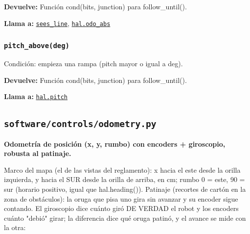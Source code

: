 \par{}\par\smallskip
\noindent\textbf{Devuelve:} Función cond(bits, junction) para follow\_until().\par
\noindent\textbf{Llama a:} \hyperref[fn:linefollow:sees-line]{\texttt{sees\_\allowbreak{}line}}, \hyperref[fn:hal:odo-abs]{\texttt{hal.odo\_\allowbreak{}abs}}\par

\subsubsection{\texttt{pitch\_\allowbreak{}above(deg)}}\label{fn:linefollow:pitch-above}
\noindent Condición: empieza una rampa (pitch mayor o igual a deg).

\par{}\par\smallskip
\noindent\textbf{Devuelve:} Función cond(bits, junction) para follow\_until().\par
\noindent\textbf{Llama a:} \hyperref[fn:hal:pitch]{\texttt{hal.pitch}}\par

\subsection{\texttt{software/controls/odometry.py}}\label{mod:odometry}
\textbf{Odometría de posición (x, y, rumbo) con encoders + giroscopio, robusta al patinaje.}

Marco del mapa (el de las vistas del reglamento): x hacia el este desde la orilla izquierda, y hacia el SUR desde la orilla de arriba, en cm; rumbo 0 = este, 90 = sur (horario positivo, igual que hal.heading()). Patinaje (recortes de cartón en la zona de obstáculos): la oruga que pisa uno gira sin avanzar y su encoder sigue contando. El giroscopio dice cuánto giró DE VERDAD el robot y los encoders cuánto "debió" girar; la diferencia dice qué oruga patinó, y el avance se mide con la otra:

